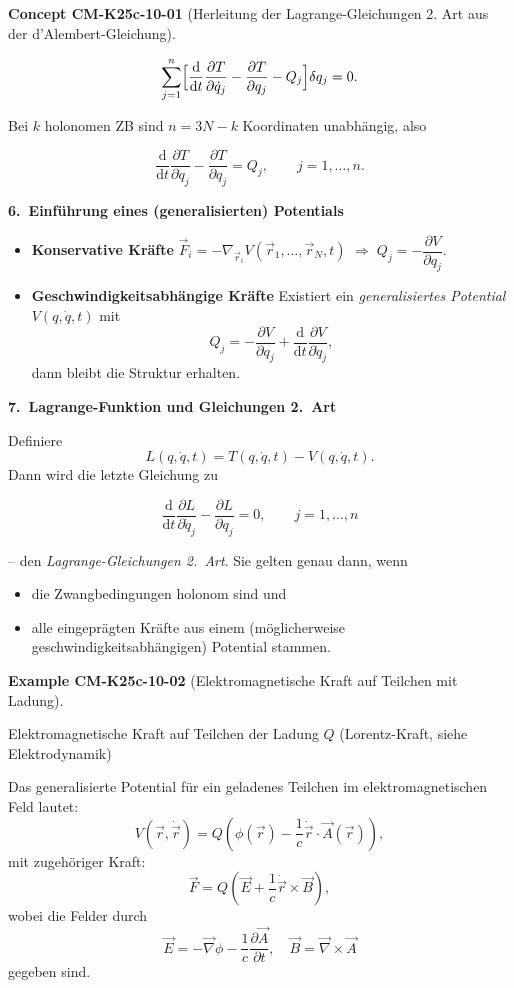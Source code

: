 \documentclass[10pt, letterpaper]{article}
\newcommand{\CustomHeading}[3]{%
  \par\medskip\noindent%
  \textbf{#1 #2} \textnormal{(#3)}.\enskip%
}
\newenvironment{EXA}[2]{\CustomHeading{Example}{#1}{#2}}{}
\newenvironment{CONC}[2]{\CustomHeading{Concept}{#1}{#2}}{}
\begin{document}
\begin{CONC}{CM-K25c-10-01}{Herleitung der Lagrange-Gleichungen 2. Art aus der d’Alembert-Gleichung}
\[
  \sum_{j=1}^{n}
    \Bigl[
      \frac{\mathrm d}{\mathrm dt}\frac{\partial T}{\partial\dot q_j}
      -
      \frac{\partial T}{\partial q_j}
      -
      Q_j
    \Bigr]\delta q_j=0.
\]

Bei $k$ holonomen ZB sind $n=3N-k$ Koordinaten unabhängig, also

\[
  \boxed{\;
    \frac{\mathrm d}{\mathrm dt}\frac{\partial T}{\partial\dot q_j}
    -
    \frac{\partial T}{\partial q_j}
    =Q_j,
    \qquad j=1,\dots,n .\;}
\]

\textbf{6.\ Einführung eines (generalisierten) Potentials}

\begin{itemize}
\item \textbf{Konservative Kräfte}  
      $\vec F_i=-\nabla_{\vec r_i}V(\vec r_1,\dots,\vec r_N,t)$  
      $\Longrightarrow\;Q_j=-\dfrac{\partial V}{\partial q_j}$.
\item \textbf{Geschwindigkeitsabhängige Kräfte}  
      Existiert ein \emph{generalisiertes Potential}
      $V(q,\dot q,t)$ mit
      \[
        Q_j=-\frac{\partial V}{\partial q_j}
            +\frac{\mathrm d}{\mathrm dt}
             \frac{\partial V}{\partial\dot q_j},
      \]
      dann bleibt die Struktur erhalten.
\end{itemize}

\textbf{7.\ Lagrange-Funktion und Gleichungen 2.\ Art}

Definiere
\[
  L(q,\dot q,t)=T(q,\dot q,t)-V(q,\dot q,t).
\]
Dann wird die letzte Gleichung zu

\[
  \boxed{\;
    \frac{\mathrm d}{\mathrm dt}\frac{\partial L}{\partial\dot q_j}
    -
    \frac{\partial L}{\partial q_j}=0,
    \qquad j=1,\dots,n
  \;}
\]

– den \emph{Lagrange-Gleichungen 2.\ Art}.  
Sie gelten genau dann, wenn
\begin{itemize}
  \item die Zwangbedingungen holonom sind und
  \item alle eingeprägten Kräfte aus einem (möglicherweise
        geschwindigkeitsabhängigen) Potential stammen.
\end{itemize}
\end{CONC}

\begin{EXA}{CM-K25c-10-02}{Elektromagnetische Kraft auf Teilchen mit Ladung}
Elektromagnetische Kraft auf Teilchen der Ladung $Q$ (Lorentz-Kraft, siehe Elektrodynamik)

Das generalisierte Potential für ein geladenes Teilchen im elektromagnetischen Feld lautet:
\[
V(\vec{r}, \dot{\vec{r}}) = Q \left( \phi(\vec{r}) - \frac{1}{c} \dot{\vec{r}} \cdot \vec{A}(\vec{r}) \right),
\]
mit zugehöriger Kraft:
\[
\vec{F} = Q \left( \vec{E} + \frac{1}{c} \dot{\vec{r}} \times \vec{B} \right),
\]
wobei die Felder durch
\[
\vec{E} = -\vec{\nabla} \phi - \frac{1}{c} \frac{\partial \vec{A}}{\partial t}, 
\quad 
\vec{B} = \vec{\nabla} \times \vec{A}
\]
gegeben sind.

\vspace{1em}
\end{EXA}
\end{document}
